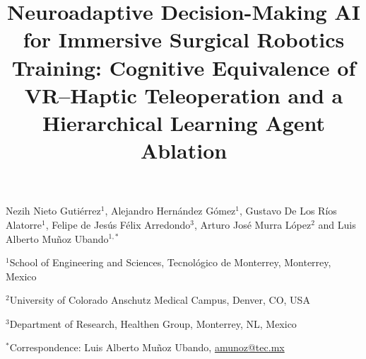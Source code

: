 \documentclass[utf8]{frontiers_suppmat}
\begin{document}
\onecolumn
{}

\title[Neuroadaptive RIDL: Cognitive Equivalence of VR--Haptic Teleoperation]{Neuroadaptive Decision-Making AI for Immersive Surgical Robotics Training: Cognitive Equivalence of VR--Haptic Teleoperation and a Hierarchical Learning Agent Ablation}

\maketitle
{\fontsize{11}{15}\selectfont\raggedright
Nezih Nieto Guti\'errez$^{1}$, Alejandro Hern\'andez G\'omez$^{1}$, Gustavo De Los R\'ios Alatorre$^{1}$, Felipe de Jes\'us F\'elix Arredondo$^{3}$, Arturo Jos\'e Murra L\'opez$^{2}$ and Luis Alberto Mu\~noz Ubando$^{1,*}$\par}
\smallskip
{\small\raggedright
$^{1}$School of Engineering and Sciences, Tecnol\'ogico de Monterrey, Monterrey, Mexico\par
$^{2}$University of Colorado Anschutz Medical Campus, Denver, CO, USA\par
$^{3}$Department of Research, Healthen Group, Monterrey, NL, Mexico\par
$^{*}$Correspondence: Luis Alberto Mu\~noz Ubando, \url{amunoz@tec.mx}\par}
\medskip

\end{document}
